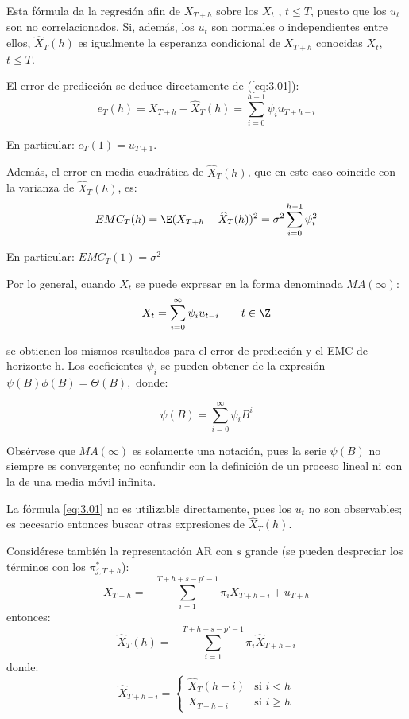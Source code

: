 Esta f\'{o}rmula da la regresi\'{o}n afin de $X_{{T+h}}$ sobre los $X_{t}$ , $t\le T$, puesto que los $u_{t}$ son no correlacionados. Si, adem\'{a}s, los $u_{t}$ son normales o independientes entre ellos, $\widehat{X}_{T} (h)$ es igualmente la esperanza condicional de $X_{{T+h}}$ conocidas $X_{t}$, $t \le T$.\newline

El error de predicci\'{o}n se deduce directamente de (\ref{eq:3.01}):
\[
e_{T} (h)=X_{T+h} -\widehat{X} _{T} 
(h)=\sum_{i=0}^{h-1} {\psi_{i} u_{T+h-i} } 
\]

En particular: $e_{T} (1)=u_{T+1}$.\newline

Adem\'{a}s, el error en media cuadr\'{a}tica de $\widehat{X}_{T} (h)$, que en este caso coincide con la varianza de $\widehat{X}_{T} (h)$, es: 
\[
EMC_{T} (h)=\E(X_{T+h} -\widehat{X} _{T} (h))^{2}=\sigma ^{2}\sum_{i=0}^{h-1} {\psi_{i}^{2} } 
\]

En particular: $EMC_{T} (1)=\sigma^{2}$

\begin{observacion}
Por lo general, cuando $X_{t} $ se puede expresar en la forma denominada $MA(\infty )$:
\[
X_{t} =\sum_{i=0}^\infty {\psi_{i} u_{t-i} } \qquad t\in \Z
\]

se obtienen los mismos resultados para el error de predicci\'{o}n y el EMC de horizonte h. Los coeficientes $\psi_{i} $ se pueden obtener de la expresi\'{o}n $\psi (B)\phi (B)=\Theta (B),$ donde:

\[
\psi (B)=\sum_{i=0}^{\infty } \psi_{i} B^{i}
\]

Obs\'{e}rvese que $MA(\infty )$ es solamente una notaci\'{o}n, pues la serie $\psi (B)$ no siempre es convergente; no confundir con la definici\'{o}n de un proceso lineal ni con la de una media m\'{o}vil infinita.
\end{observacion}

La f\'{o}rmula \eqref{eq:3.01} no es utilizable directamente, pues los $u_{t}$ no son observables; es necesario entonces buscar otras expresiones de $\widehat{X} _{T} (h)$.\newline

Consid\'{e}rese tambi\'{e}n la representaci\'{o}n AR con $s$ grande (se pueden despreciar los t\'{e}rminos con los $\pi^{\ast}_{j, T+h}$):
\[
X_{T+h} =-\sum_{i=1}^{T+h+s-p'-1} {\pi_{i} X_{T+h-i} +u_{T+h} } 
\]
entonces:
\begin{equation}
\label{eq:3.02}
 \widehat{X} _{T} (h)=-\sum_{i=1}^{T+h+s-p'-1} {\pi_{i} \widehat{X}_{T+h-i} } 
\end{equation}
donde: 
\[
\widehat{X}_{T+h-i} =\begin{cases}
                          \widehat{X} _{T} (h-i) & \text{si } i<h \\
                          X_{T+h-i} & \text{si } i\ge h
                         \end{cases}
\]

